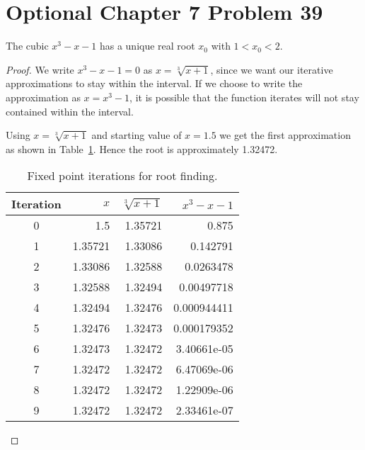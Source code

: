 \documentclass{article}
\newtheorem{proof}{Proof}
\begin{document}
\section{Optional Chapter 7 Problem 39}
The cubic $x^3-x-1$ has a unique real root $x_0$ with $1<x_0<2$.


\begin{proof}
We write $x^3-x-1=0$ as $x=\sqrt[3]{x+1}$, since we want our
iterative approximations to stay within the interval. If we choose
to write the approximation as $x=x^3-1$, it is possible that the 
function iterates will not stay contained within the interval.

Using $x=\sqrt[3]{x+1}$ and starting value of $x=1.5$ we get
the first approximation as shown in Table~\ref{tab:root_difference}.
Hence the root is approximately 1.32472.
\begin{table}
\begin{center}
\begin{tabular}{|c|r|r|r|}
\hline
Iteration & $x$ & $\sqrt[3]{x+1}$ & $x^3-x-1$ \\
\hline
\hline
0	& 1.5	& 1.35721	& 0.875 \\
1	& 1.35721	& 1.33086	& 0.142791 \\
2	& 1.33086	& 1.32588	& 0.0263478 \\
3	& 1.32588	& 1.32494	& 0.00497718 \\
4	& 1.32494	& 1.32476	& 0.000944411 \\
5	& 1.32476	& 1.32473	& 0.000179352 \\
6	& 1.32473	& 1.32472	& 3.40661e-05 \\
7	& 1.32472	& 1.32472	& 6.47069e-06 \\
8	& 1.32472	& 1.32472	& 1.22909e-06 \\
9	& 1.32472	& 1.32472	& 2.33461e-07 \\
\hline
\end{tabular}
\caption{Fixed point iterations for root finding.}
\label{tab:root_difference}
\end{center}
\end{table}


\end{proof}
\end{document}
